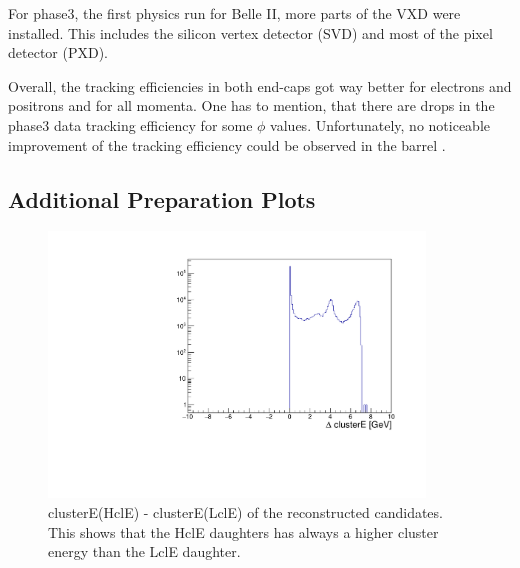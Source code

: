 \documentclass[a4paper,11pt,twosided,final,german,openbib,pdftex,listof=totoc,bibliography=totoc]{scrbook}
\begin{document}
For phase3, the first physics run for Belle II, more parts of the VXD were installed. This includes the silicon vertex detector (SVD) and most of the pixel detector (PXD). 

Overall, the tracking efficiencies in both end-caps got way better for electrons and positrons and for all momenta. One has to mention, that there are drops in the phase3 data tracking efficiency for some $\phi$ values.
Unfortunately, no noticeable improvement of the tracking efficiency could be observed in the barrel .




\begin{appendix}
	

	
	
\chapter{Additional Preparation Plots}


\begin{figure}[h!]
	\centering
	\includegraphics[width=10cm]{AnhangPlots/clEDiff.pdf}
	\caption[clusterE(HclE) - clusterE(LclE)]{clusterE(HclE) - clusterE(LclE) of the reconstructed candidates. This shows that the HclE daughters has always a higher cluster energy than the LclE daughter.}
	\label{fig:clEDiff}
\end{figure}




\end{appendix}
\end{document}
